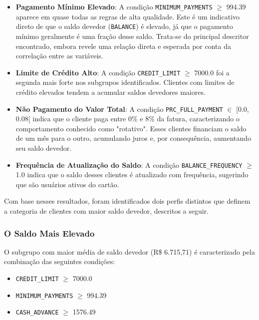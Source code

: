 \documentclass[12pt]{article}
\begin{document}
\begin{itemize}
    \item \textbf{Pagamento Mínimo Elevado}: A condição \texttt{MINIMUM\_PAYMENTS} $\geq$ 994.39 aparece em quase todas as regras de alta qualidade. Este é um indicativo direto de que o saldo devedor (\texttt{BALANCE}) é elevado, já que o pagamento mínimo geralmente é uma fração desse saldo. Trata-se do principal descritor encontrado, embora revele uma relação direta e esperada por conta da correlação entre as variáveis.

    \item \textbf{Limite de Crédito Alto}: A condição \texttt{CREDIT\_LIMIT} $\geq$ 7000.0 foi a segunda mais forte nos subgrupos identificados. Clientes com limites de crédito elevados tendem a acumular saldos devedores maiores.

    \item \textbf{Não Pagamento do Valor Total}: A condição \texttt{PRC\_FULL\_PAYMENT} $\in$ [0.0, 0.08[ indica que o cliente paga entre 0\% e 8\% da fatura, caracterizando o comportamento conhecido como "rotativo". Esses clientes financiam o saldo de um mês para o outro, acumulando juros e, por consequência, aumentando seu saldo devedor.

    \item \textbf{Frequência de Atualização do Saldo}: A condição \texttt{BALANCE\_FREQUENCY} $\geq$ 1.0 indica que o saldo desses clientes é atualizado com frequência, sugerindo que são usuários ativos do cartão.
\end{itemize}

Com base nesses resultados, foram identificados dois perfis distintos que definem a categoria de clientes com maior saldo devedor, descritos a seguir.

\subsubsection{O Saldo Mais Elevado}

O subgrupo com maior média de saldo devedor (R\$ 6.715,71) é caracterizado pela combinação das seguintes condições:
\begin{itemize}
    \item \texttt{CREDIT\_LIMIT} $\geq$ 7000.0
    \item \texttt{MINIMUM\_PAYMENTS} $\geq$ 994.39
    \item \texttt{CASH\_ADVANCE} $\geq$ 1576.49
\end{itemize}
\end{document}
